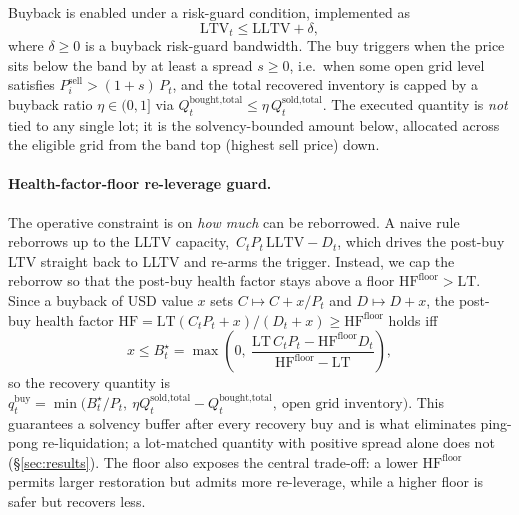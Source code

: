 \documentclass[12pt]{article}
\begin{document}
Buyback is enabled under a risk-guard condition, implemented as
\[
\mathrm{LTV}_t\le \mathrm{LLTV}+\delta,
\]
where $\delta\ge0$ is a buyback risk-guard bandwidth. The buy triggers when the price sits below the band by at least a spread $s\ge0$, i.e.\ when some open grid level satisfies $P_i^{\text{sell}} > (1+s)\,P_t$, and the total recovered inventory is capped by a buyback ratio $\eta\in(0,1]$ via $Q_t^{\text{bought,total}}\le\eta\,Q_t^{\text{sold,total}}$. The executed quantity is \emph{not} tied to any single lot; it is the solvency-bounded amount below, allocated across the eligible grid from the band top (highest sell price) down.

\paragraph{Health-factor-floor re-leverage guard.}
\label{par:hffloor}
The operative constraint is on \emph{how much} can be reborrowed. A naive rule reborrows up to the LLTV capacity, $\,C_tP_t\,\mathrm{LLTV}-D_t$, which drives the post-buy LTV straight back to LLTV and re-arms the trigger. Instead, we cap the reborrow so that the post-buy health factor stays above a floor $\mathrm{HF}^{\text{floor}}>\mathrm{LT}$. Since a buyback of USD value $x$ sets $C\mapsto C+x/P_t$ and $D\mapsto D+x$, the post-buy health factor $\mathrm{HF}=\mathrm{LT}(C_tP_t+x)/(D_t+x)\ge\mathrm{HF}^{\text{floor}}$ holds iff
\[
x \le B_t^{\star}=\max\!\left(0,\ \frac{\mathrm{LT}\,C_tP_t-\mathrm{HF}^{\text{floor}}D_t}{\mathrm{HF}^{\text{floor}}-\mathrm{LT}}\right),
\]
so the recovery quantity is $q_t^{\text{buy}}=\min\!\big(B_t^{\star}/P_t,\ \eta Q_t^{\text{sold,total}}-Q_t^{\text{bought,total}},\ \text{open grid inventory}\big)$. This guarantees a solvency buffer after every recovery buy and is what eliminates ping-pong re-liquidation; a lot-matched quantity with positive spread alone does not (\S\ref{sec:results}). The floor also exposes the central trade-off: a lower $\mathrm{HF}^{\text{floor}}$ permits larger restoration but admits more re-leverage, while a higher floor is safer but recovers less.
\end{document}
